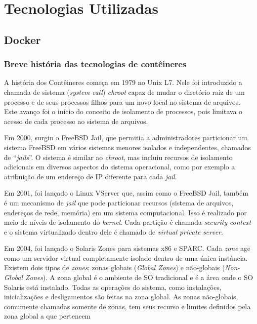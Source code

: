 \chapter{Tecnologias Utilizadas}
    \section{Docker}
	\subsection{Breve história das tecnologias de contêineres}
	A história dos Contêineres começa em 1979 no Unix L7. Nele foi introduzido a chamada de sistema (\textit{system call}) \textit{chroot} capaz de mudar o diretório raiz de um processo e de seus processos filhos para um novo local no sistema de arquivos. Este avanço foi o início do conceito de isolamento de processos, pois limitava o acesso de cada processo ao sistema de arquivos. 

	Em 2000, surgiu o FreeBSD Jail, que permitia a administradores particionar um sistema FreeBSD em vários sistemas menores isolados e independentes, chamados de “\textit{jails}”. O sistema é similar ao \textit{chroot}, mas incluiu recursos de isolamento adicionais em diversos aspectos do sistema operacional, como por exemplo a atribuição de um endereço de IP diferente para cada \textit{jail}. \cite{abriefhistoryofcontainers}

	Em 2001, foi lançado o Linux VServer que, assim como o FreeBSD Jail, também é um mecanismo de \textit{jail} que pode particionar recursos (sistema de arquivos, endereços de rede, memória) em um sistema computacional. Isso é realizado por meio de níveis de isolamento do \textit{kernel}. Cada partição é chamada \textit{security context} e o sistema virtualizado dentro dele é chamado de \textit{virtual private server}. \cite{linuxvserver}

	Em 2004, foi lançado o Solaris Zones para sistemas x86 e SPARC. Cada \textit{zone} age como um servidor virtual completamente isolado dentro de uma única instância. Existem dois tipos de \textit{zones}: zonas globais (\textit{Global Zones}) e não-globais (\textit{Non-Global Zones}). A zona global é o ambiente de SO tradicional e é a área onde o SO Solaris está instalado. Todas as operações do sistema, como instalações, inicializações e desligamentos são feitas na zona global. As zonas não-globais, comumente chamadas somente de zonas, tem seus recurso e limites definidos pela zona global a que pertencem  \cite{introductiontosolariszone}

